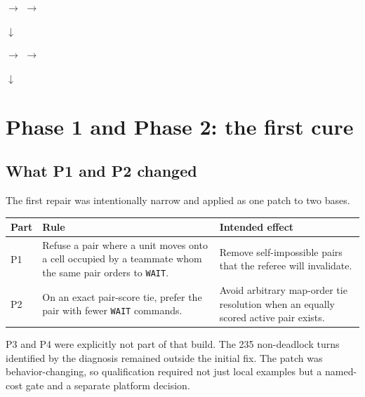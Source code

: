 \documentclass[10pt,a4paper]{article}
\newcommand{\code}[1]{\texttt{#1}}
\begin{document}
\begin{center}
\setlength{\fboxsep}{7pt}
\quad$\rightarrow$\quad
{}
\quad$\rightarrow$\quad
{}

\vspace{4pt}
$\downarrow$

\vspace{4pt}
\quad$\rightarrow$\quad
{}
\quad$\rightarrow$\quad
{}

\vspace{4pt}
$\downarrow$

\vspace{4pt}
\end{center}

\section{Phase 1 and Phase 2: the first cure}

\subsection{What P1 and P2 changed}

The first repair was intentionally narrow and applied as one patch to two bases.

\begin{tabularx}{\textwidth}{@{}p{20mm}p{42mm}Y@{}}
\toprule
\textbf{Part} & \textbf{Rule} & \textbf{Intended effect} \\
\midrule
P1 & Refuse a pair where a unit moves onto a cell occupied by a teammate whom the same pair orders to \code{WAIT}. & Remove self-impossible pairs that the referee will invalidate. \\
P2 & On an exact pair-score tie, prefer the pair with fewer \code{WAIT} commands. & Avoid arbitrary map-order tie resolution when an equally scored active pair exists. \\
\bottomrule
\end{tabularx}

P3 and P4 were explicitly not part of that build. The 235 non-deadlock turns identified by the
diagnosis remained outside the initial fix. The patch was behavior-changing, so qualification
required not just local examples but a named-cost gate and a separate platform decision.
\end{document}
